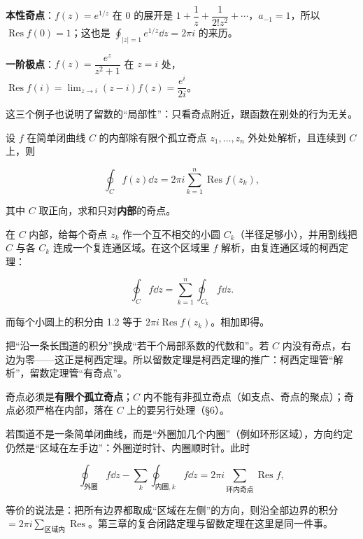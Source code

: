 \documentclass[11pt]{ctexart}
\let\origsubhdr\subhdr
\renewcommand{\subhdr}[1]{\par\needspace{4\baselineskip}\origsubhdr{#1}}
\let\orighdr\hdr
\renewcommand{\hdr}[2]{\par\orighdr{#1}{#2}}
\begin{document}
\textbf{本性奇点}：$f(z)=e^{1/z}$ 在 $0$ 的展开是 $1+\dfrac1z+\dfrac{1}{2!z^{2}}+\cdots$，$a_{-1}=1$，所以 $\operatorname{Res}f(0)=1$；这也是 $\oint_{|z|=1}e^{1/z}\dd z=2\pi i$ 的来历。

\textbf{一阶极点}：$f(z)=\dfrac{e^{z}}{z^{2}+1}$ 在 $z=i$ 处，$\operatorname{Res}f(i)=\lim_{z\to i}(z-i)f(z)=\dfrac{e^{i}}{2i}$。

这三个例子也说明了留数的“局部性”：只看奇点附近，跟函数在别处的行为无关。



设 $f$ 在简单闭曲线 $C$ 的内部除有限个孤立奇点 $z_1,\dots,z_n$ 外处处解析，且连续到 $C$ 上，则

\[ \oint_C f(z)\dd z=2\pi i\sum_{k=1}^{n}\operatorname{Res}f(z_k) , \]

其中 $C$ 取正向，求和只对\textbf{内部}的奇点。


在 $C$ 内部，给每个奇点 $z_k$ 作一个互不相交的小圆 $C_k$（半径足够小），并用割线把 $C$ 与各 $C_k$ 连成一个复连通区域。在这个区域里 $f$ 解析，由复连通区域的柯西定理：

\[ \oint_C f\dd z=\sum_{k=1}^{n}\oint_{C_k}f\dd z . \]

而每个小圆上的积分由 1.2 等于 $2\pi i\operatorname{Res}f(z_k)$。相加即得。



把“沿一条长围道的积分”换成“若干个局部系数的代数和”。若 $C$ 内没有奇点，右边为零——这正是柯西定理。所以留数定理是柯西定理的推广：柯西定理管“解析”，留数定理管“有奇点”。


奇点必须是\textbf{有限个孤立奇点}；$C$ 内不能有非孤立奇点（如支点、奇点的聚点）；奇点必须严格在内部，落在 $C$ 上的要另行处理（§6）。


若围道不是一条简单闭曲线，而是“外圈加几个内圈”（例如环形区域），方向约定仍然是“区域在左手边”：外圈逆时针、内圈顺时针。此时

\[ \oint_{\text{外圈}}f\dd z-\sum_k\oint_{\text{内圈},k}f\dd z=2\pi i\sum_{\text{环内奇点}}\operatorname{Res}f , \]

等价的说法是：把所有边界都取成“区域在左侧”的方向，则沿全部边界的积分 $=2\pi i\sum_{\text{区域内}}\operatorname{Res}$。第三章的复合闭路定理与留数定理在这里是同一件事。
\end{document}
